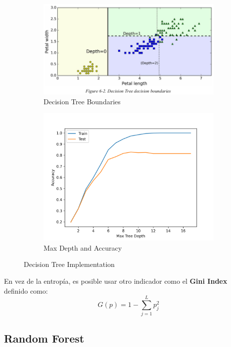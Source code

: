 \begin{figure}[H]
\begin{subfigure}{.5\textwidth}
    \center
    \includegraphics[scale=0.3]{notebooks/ML/img/decision_tree_data.png}
    \caption{Decision Tree Boundaries}
\end{subfigure}%
\begin{subfigure}{.5\textwidth}
    \center
    \includegraphics[scale=0.4]{notebooks/ML/img/max_depth_decision_tree.png}
    \caption{Max Depth and Accuracy}
\end{subfigure}
\caption{Decision Tree Implementation}
\label{fig:fig}
\end{figure}

En vez de la entropía, es posible usar otro indicador como el \textbf{Gini Index} definido como: 
$$G(p) = 1 - \sum_{j=1}^L p_j^2$$

\subsection{Random Forest}

